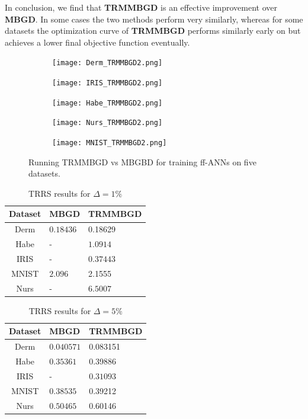 \documentclass[letterpaper,12pt,titlepage,oneside,final]{book}
\begin{document}
	In conclusion, we find that \textbf{TRMMBGD} is an effective improvement over \textbf{MBGD}. In some cases the two methods perform very similarly, whereas for some datasets the optimization curve of \textbf{TRMMBGD} performs similarly early on but achieves a lower final objective function eventually. 
	
	
	\begin{figure}
		\centering
		\begin{subfigure}{.45\textwidth}
			\texttt{[image: Derm\_TRMMBGD2.png]}
		\end{subfigure}
		\begin{subfigure}{.45\textwidth}
			\texttt{[image: IRIS\_TRMMBGD2.png]}
		\end{subfigure}
		\begin{subfigure}{.45\textwidth}
			\texttt{[image: Habe\_TRMMBGD2.png]}
		\end{subfigure}
		\begin{subfigure}{.45\textwidth}
			\texttt{[image: Nurs\_TRMMBGD2.png]}
		\end{subfigure}
		\begin{subfigure}{.45\textwidth}
			\texttt{[image: MNIST\_TRMMBGD2.png]}
		\end{subfigure}
		\caption{Running TRMMBGD vs MBGBD for training ff-ANNs on five datasets.}
		\label{figure:TRMMBGD}
	\end{figure}
	
	\begin{table}[h] 
		\centering 
		\begin{tabular}{ |c|l|l| } 
			\hline 
			\textbf{Dataset} & \textbf{MBGD} & \textbf{TRMMBGD}\\ 
			\hline 
			Derm & $\mathbf{0.18436}$ &0.18629\\ 
			\hline 
			Habe & - & $\mathbf{1.0914}$\\ 
			\hline 
			IRIS & - & $\mathbf{0.37443}$\\ 
			\hline 
			MNIST & $\mathbf{2.096}$ &2.1555\\ 
			\hline 
			Nurs & - & $\mathbf{6.5007}$\\ 
			\hline 
		\end{tabular} 
		\caption{TRRS results for $\Delta = 1\%$} \label{TRMMBGD1} \end{table}
	
	\begin{table}[h] 
		\centering 
		\begin{tabular}{ |c|l|l| } 
			\hline 
			\textbf{Dataset} & \textbf{MBGD} &  \textbf{TRMMBGD}\\ 
			\hline 
			Derm & $\mathbf{0.040571}$ &0.083151\\ 
			\hline 
			Habe & $\mathbf{0.35361}$ &0.39886\\ 
			\hline 
			IRIS & - & $\mathbf{0.31093}$\\ 
			\hline 
			MNIST & $\mathbf{0.38535}$ &0.39212\\ 
			\hline 
			Nurs & $\mathbf{0.50465}$ &0.60146\\ 
			\hline 
		\end{tabular} 
		\caption{TRRS results for $\Delta = 5\%$} \label{TRMMBGD5} \end{table}
	
\end{document}
